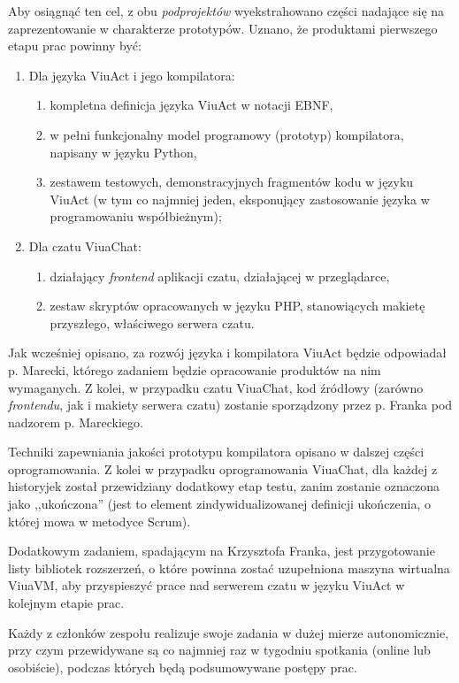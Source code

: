 \documentclass[11pt,oneside,a4paper,titlepage,onecolumn]{article}
\begin{document}
Aby osiągnąć ten cel, z obu \textit{podprojektów} wyekstrahowano części nadające się na zaprezentowanie
w charakterze prototypów. Uznano, że produktami pierwszego etapu prac powinny być:
\begin{enumerate}
	\item Dla języka ViuAct i jego kompilatora:
		\begin{enumerate}
			\item kompletna definicja języka ViuAct w notacji EBNF,
			\item w pełni funkcjonalny model programowy (prototyp) kompilatora, napisany w języku Python,
			\item zestawem testowych, demonstracyjnych fragmentów kodu w języku ViuAct (w tym co najmniej 
			jeden, eksponujący zastosowanie języka w programowaniu współbieżnym);
		\end{enumerate}
	\item Dla czatu ViuaChat:
		\begin{enumerate}
			\item działający \textit{frontend} aplikacji czatu, działającej w przeglądarce,
			\item zestaw skryptów opracowanych w języku PHP, stanowiących makietę przyszłego, właściwego serwera czatu.
		\end{enumerate}
\end{enumerate}

Jak wcześniej opisano, za rozwój języka i kompilatora ViuAct będzie odpowiadał p. Marecki, którego zadaniem 
będzie opracowanie produktów na nim wymaganych. Z kolei, w przypadku czatu ViuaChat, kod źródłowy (zarówno 
\textit{frontendu}, jak i makiety serwera czatu) zostanie sporządzony przez p. Franka pod nadzorem p. Mareckiego.

Techniki zapewniania jakości prototypu kompilatora opisano w dalszej części oprogramowania. Z kolei w przypadku
oprogramowania ViuaChat, dla każdej z historyjek został przewidziany dodatkowy etap testu, zanim zostanie
oznaczona jako ,,ukończona'' (jest to element zindywidualizowanej definicji ukończenia, o której mowa w metodyce 
Scrum).

Dodatkowym zadaniem, spadającym na Krzysztofa Franka, jest przygotowanie listy bibliotek rozszerzeń, o które
powinna zostać uzupełniona maszyna wirtualna ViuaVM, aby przyspieszyć prace nad serwerem czatu w języku
ViuAct w kolejnym etapie prac.

Każdy z członków zespołu realizuje swoje zadania w dużej mierze autonomicznie, przy czym przewidywane są co
najmniej raz w tygodniu spotkania (online lub osobiście), podczas których będą podsumowywane postępy prac.
\end{document}

